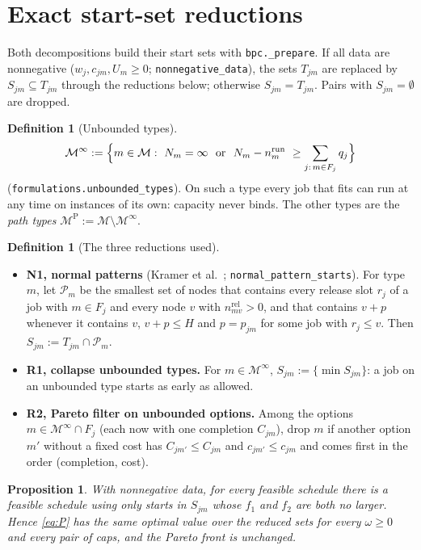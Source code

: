 \documentclass[11pt,a4paper]{article}
\newtheorem{proposition}[theorem]{Proposition}
\theoremstyle{definition}
\newtheorem{definition}[theorem]{Definition}
\theoremstyle{remark}
\newcommand{\M}{\mathcal{M}}
\newcommand{\Minf}{\M^{\infty}}
\newcommand{\MP}{\M^{\mathrm{P}}}
\newcommand{\code}[1]{\texttt{#1}}
\newcommand{\nrun}{n^{\mathrm{run}}}
\newcommand{\nrel}{n^{\mathrm{rel}}}
\begin{document}
\section{Exact start-set reductions}\label{sec:reductions}

Both decompositions build their start sets with \code{bpc.\_prepare}. If all
data are nonnegative ($w_j,c_{jm},U_m\ge0$; \code{nonnegative\_data}), the sets
$T_{jm}$ are replaced by $S_{jm}\subseteq T_{jm}$ through the reductions
below; otherwise $S_{jm}=T_{jm}$. Pairs with $S_{jm}=\emptyset$ are dropped.

\begin{definition}[Unbounded types]\label{def:unbounded}
\[
\Minf:=\Bigl\{m\in\M:\ N_m=\infty\ \ \text{or}\ \ N_m-\nrun_m\ \ge\sum_{j:\,m\in F_j}q_j\Bigr\}
\]
(\code{formulations.unbounded\_types}). On such a type every job that fits can
run at any time on instances of its own: capacity never binds. The other types
are the \emph{path types} $\MP:=\M\setminus\Minf$.
\end{definition}

\begin{definition}[The three reductions used]
\begin{itemize}[leftmargin=*]
\item \textbf{N1, normal patterns} (Kramer et al.~\cite{kramer2020};
  \code{normal\_pattern\_starts}). For type $m$, let $\mathcal P_m$ be the
  smallest set of nodes that contains every release slot $r_j$ of a job with
  $m\in F_j$ and every node $v$ with $\nrel_{mv}>0$, and that contains $v+p$
  whenever it contains $v$, $v+p\le H$ and $p=p_{jm}$ for some job with
  $r_j\le v$. Then $S_{jm}:=T_{jm}\cap\mathcal P_m$.
\item \textbf{R1, collapse unbounded types.} For $m\in\Minf$,
  $S_{jm}:=\{\min S_{jm}\}$: a job on an unbounded type starts as early as
  allowed.
\item \textbf{R2, Pareto filter on unbounded options.} Among the options
  $m\in\Minf\cap F_j$ (each now with one completion $C_{jm}$), drop $m$ if
  another option $m'$ without a fixed cost has $C_{jm'}\le C_{jm}$ and
  $c_{jm'}\le c_{jm}$ and comes first in the order (completion, cost).
\end{itemize}
\end{definition}

\begin{proposition}\label{prop:reductions}
With nonnegative data, for every feasible schedule there is a feasible schedule
using only starts in $S_{jm}$ whose $f_1$ and $f_2$ are both no larger. Hence
\eqref{eq:P} has the same optimal value over the reduced sets for every
$\omega\ge0$ and every pair of caps, and the Pareto front is unchanged.
\end{proposition}
\end{document}
